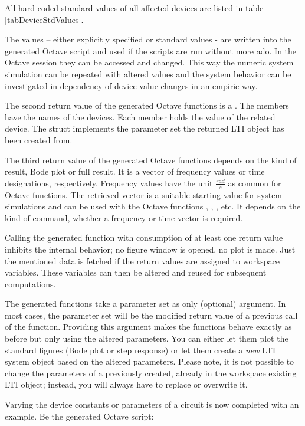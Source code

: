 All hard coded standard values of all affected devices are listed in table
\ref{tabDeviceStdValues}.

The values -- either explicitly specified or standard values - are written
into the generated Octave script and used if the scripts are run without
more ado. In the Octave session they can be accessed and changed. This way the
numeric system simulation can be repeated with altered values and the
system behavior can be investigated in dependency of device value changes
in an empiric way. 

The second return value of the generated Octave functions is a
. The members have the names of the devices. Each member holds
the value of the related device. The struct implements the parameter set
the returned LTI object has been created from.

The third return value of the generated Octave functions depends on the
kind of result, Bode plot or full result. It is a vector of frequency
values or time designations, respectively. Frequency values have the unit
$\frac{rad}{s}$ as common for Octave functions. The retrieved vector is a
suitable starting value for system simulations and can be used with the
Octave functions , , , etc. It
depends on the kind of command, whether a frequency or time vector is
required.

Calling the generated function with consumption of at least one return
value inhibits the internal behavior; no figure window is opened, no plot
is made. Just the mentioned data is fetched if the return values are
assigned to workspace variables. These variables can then be altered and
reused for subsequent computations.

The generated functions take a parameter set as only (optional) argument.
In most cases, the parameter set will be the modified return value of a
previous call of the function. Providing this argument makes the functions
behave exactly as before but only using the altered parameters. You can
either let them plot the standard figures (Bode plot or step response) or
let them create a \emph{new} LTI system object based on the altered
parameters. Please note, it is not possible to change the parameters of a
previously created, already in the workspace existing LTI object; instead,
you will always have to replace or overwrite it.

Varying the device constants or parameters of a circuit is now completed
with an example. Be  the generated Octave script:

